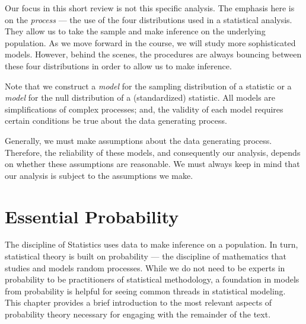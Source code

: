\documentclass[
  letterpaper,
  DIV=11,
  numbers=noendperiod]{scrreprt}
\theoremstyle{definition}
\theoremstyle{definition}
\theoremstyle{remark}
\begin{document}
Our focus in this short review is not this specific analysis. The
emphasis here is on the \emph{process} --- the use of the four
distributions used in a statistical analysis. They allow us to take the
sample and make inference on the underlying population. As we move
forward in the course, we will study more sophisticated models. However,
behind the scenes, the procedures are always bouncing between these four
distributions in order to allow us to make inference.

\begin{tcolorbox}[enhanced jigsaw, bottomrule=.15mm, titlerule=0mm, bottomtitle=1mm, colback=white, coltitle=black, rightrule=.15mm, leftrule=.75mm, toprule=.15mm, toptitle=1mm, left=2mm, opacityback=0, colframe=quarto-callout-note-color-frame, breakable, title=\textcolor{quarto-callout-note-color}{\faInfo}\hspace{0.5em}{Note}, arc=.35mm, colbacktitle=quarto-callout-note-color!10!white, opacitybacktitle=0.6]

Note that we construct a \emph{model} for the sampling distribution of a
statistic or a \emph{model} for the null distribution of a
(standardized) statistic. All models are simplifications of complex
processes; and, the validity of each model requires certain conditions
be true about the data generating process.

Generally, we must make assumptions about the data generating process.
Therefore, the reliability of these models, and consequently our
analysis, depends on whether these assumptions are reasonable. We must
always keep in mind that our analysis is subject to the assumptions we
make.

\end{tcolorbox}

\hypertarget{sec-essential-probability}{%
\chapter{Essential Probability}\label{sec-essential-probability}}

\providecommand{\norm}[1]{\lVert#1\rVert}
\providecommand{\abs}[1]{\lvert#1\rvert}
\providecommand{\dist}[1]{\stackrel{\text{#1}}{\sim}}
\providecommand{\ind}[1]{\mathbb{I}\left(#1\right)}
\providecommand{\bm}[1]{\mathbf{#1}}
\providecommand{\bs}[1]{\boldsymbol{#1}}
\providecommand{\Ell}{\mathcal{L}}
\providecommand{\indep}{\perp\negthickspace\negmedspace\perp}

The discipline of Statistics uses data to make inference on a
population. In turn, statistical theory is built on probability --- the
discipline of mathematics that studies and models random processes.
While we do not need to be experts in probability to be practitioners of
statistical methodology, a foundation in models from probability is
helpful for seeing common threads in statistical modeling. This chapter
provides a brief introduction to the most relevant aspects of
probability theory necessary for engaging with the remainder of the
text.
\end{document}
